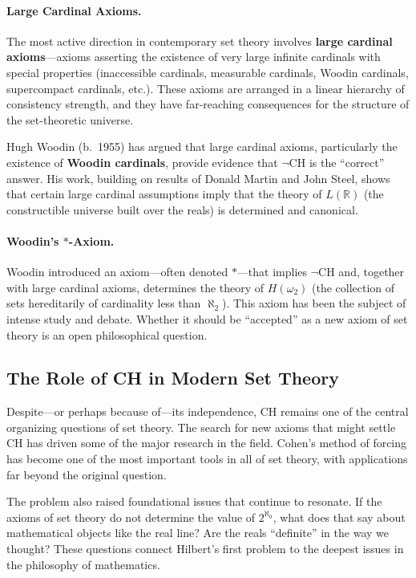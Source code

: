\paragraph{Large Cardinal Axioms.}
The most active direction in contemporary set theory involves \textbf{large cardinal axioms}---axioms asserting the existence of very large infinite cardinals with special properties (inaccessible cardinals, measurable cardinals, Woodin cardinals, supercompact cardinals, etc.). These axioms are arranged in a linear hierarchy of consistency strength, and they have far-reaching consequences for the structure of the set-theoretic universe.

Hugh Woodin (b.\ 1955) has argued that large cardinal axioms, particularly the existence of \textbf{Woodin cardinals}, provide evidence that $\neg$CH is the ``correct'' answer. His work, building on results of Donald Martin and John Steel, shows that certain large cardinal assumptions imply that the theory of $L(\mathbb{R})$ (the constructible universe built over the reals) is determined and canonical.

\paragraph{Woodin's $\ast$-Axiom.}
Woodin introduced an axiom---often denoted $\ast$---that implies $\neg$CH and, together with large cardinal axioms, determines the theory of $H(\omega_2)$ (the collection of sets hereditarily of cardinality less than $\aleph_2$). This axiom has been the subject of intense study and debate. Whether it should be ``accepted'' as a new axiom of set theory is an open philosophical question.

\subsection{The Role of CH in Modern Set Theory}

Despite---or perhaps because of---its independence, CH remains one of the central organizing questions of set theory. The search for new axioms that might settle CH has driven some of the major research in the field. Cohen's method of forcing has become one of the most important tools in all of set theory, with applications far beyond the original question.

The problem also raised foundational issues that continue to resonate. If the axioms of set theory do not determine the value of $2^{\aleph_0}$, what does that say about mathematical objects like the real line? Are the reals ``definite'' in the way we thought? These questions connect Hilbert's first problem to the deepest issues in the philosophy of mathematics.

